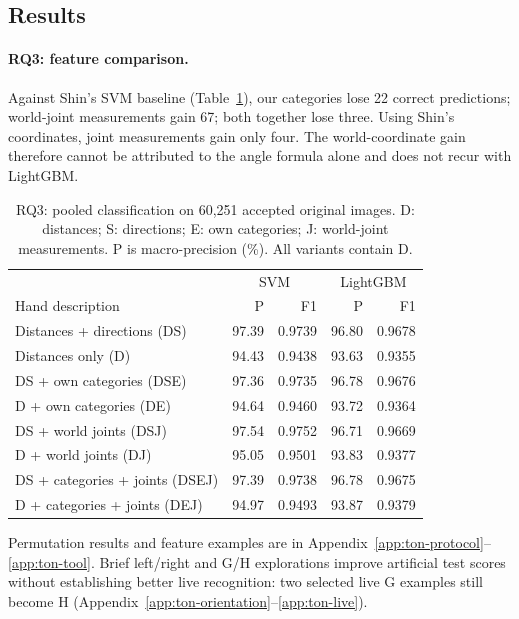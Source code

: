     
    \subsection{Results}
    \label{sec:rq2-results}

\paragraph{RQ3: feature comparison.}
Against Shin's SVM baseline (Table~\ref{tab:ton-features}), our categories lose 22 correct predictions; world-joint measurements gain 67; both together lose three. Using Shin's coordinates, joint measurements gain only four. The world-coordinate gain therefore cannot be attributed to the angle formula alone and does not recur with LightGBM.

\begin{table}[t]\centering\small
\caption{RQ3: pooled classification on 60,251 accepted original images. D: distances; S: directions; E: own categories; J: world-joint measurements. P is macro-precision (\%). All variants contain D.}
\label{tab:ton-features}
\begin{tabular}{lrrrr}\toprule
 & \multicolumn{2}{c}{SVM} & \multicolumn{2}{c}{LightGBM}\\
Hand description & P & F1 & P & F1\\\midrule
Distances + directions (DS) & 97.39 & 0.9739 & 96.80 & 0.9678 \\
Distances only (D) & 94.43 & 0.9438 & 93.63 & 0.9355 \\
DS + own categories (DSE) & 97.36 & 0.9735 & 96.78 & 0.9676 \\
D + own categories (DE) & 94.64 & 0.9460 & 93.72 & 0.9364 \\
DS + world joints (DSJ) & 97.54 & 0.9752 & 96.71 & 0.9669 \\
D + world joints (DJ) & 95.05 & 0.9501 & 93.83 & 0.9377 \\
DS + categories + joints (DSEJ) & 97.39 & 0.9738 & 96.78 & 0.9675 \\
D + categories + joints (DEJ) & 94.97 & 0.9493 & 93.87 & 0.9379 \\
\bottomrule\end{tabular}
\end{table}

Permutation results and feature examples are in Appendix~\ref{app:ton-protocol}--\ref{app:ton-tool}. Brief left/right and G/H explorations improve artificial test scores without establishing better live recognition: two selected live G examples still become H (Appendix~\ref{app:ton-orientation}--\ref{app:ton-live}).

